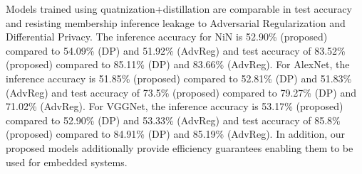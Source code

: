 Models trained using quatnization+distillation are comparable in test accuracy and resisting membership inference leakage to Adversarial Regularization and Differential Privacy.
The inference accuracy for NiN is 52.90\% (proposed) compared to 54.09\% (DP) and 51.92\% (AdvReg) and test accuracy of 83.52\% (proposed) compared to 85.11\% (DP) and 83.66\% (AdvReg).
For AlexNet, the inference accuracy is 51.85\% (proposed) compared to 52.81\% (DP) and 51.83\% (AdvReg) and test accuracy of 73.5\% (proposed) compared to 79.27\% (DP) and 71.02\% (AdvReg).
For VGGNet, the inference accuracy is 53.17\% (proposed) compared to 52.90\% (DP) and 53.33\% (AdvReg) and test accuracy of 85.8\% (proposed) compared to 84.91\% (DP) and 85.19\% (AdvReg).
In addition, our proposed models additionally provide efficiency guarantees enabling them to be used for embedded systems.

